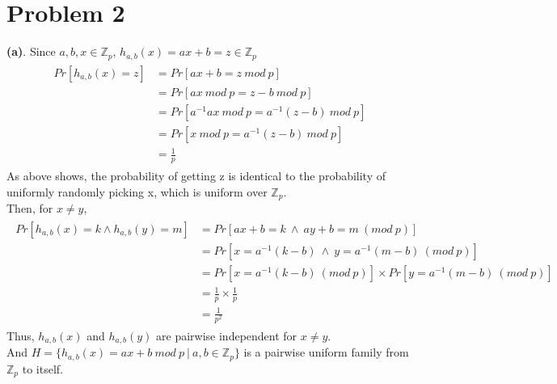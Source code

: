 \documentclass[titlepage, paper=a4, fontsize=11pt]{scrartcl} %
\numberwithin{equation}{section} %
\numberwithin{figure}{section} %
\numberwithin{table}{section} %
\begin{document}
\section*{Problem 2}
\textbf{(a)}. Since $a, b, x \in \mathbb{Z}_p$, $h_{a,b}(x) = ax+b = z \in \mathbb{Z}_p$
\begin{align*} 
\begin{split}
Pr[h_{a,b}(x) = z] &= Pr[ax+b = z \ mod \ p] \\
&= Pr[ax \ mod \ p = z-b \ mod \ p] \\
&= Pr[a^{-1}ax \ mod \ p = a^{-1}(z-b) \ mod \ p] \\
&= Pr[x \ mod \ p = a^{-1}(z-b) \ mod \ p] \\
&= \frac{1}{p}
\end{split}					
\end{align*}
As above shows, the probability of getting z is identical to the probability of uniformly randomly picking x, which is uniform over $\mathbb{Z}_p$. \\
Then, for $x \neq y$,
\begin{align*} 
\begin{split}
Pr[h_{a,b}(x) = k \land h_{a,b}(y) = m] &= Pr[ax+b=k \ \land \ ay+b=m \  (mod\ p)] \\
&= Pr[x=a^{-1}(k-b) \ \land \ y=a^{-1}(m-b) \  (mod\ p)] \\
&= Pr[x=a^{-1}(k-b) \  (mod\ p)] \times Pr[y=a^{-1}(m-b) \ (mod\ p)] \\
&= \frac{1}{p} \times \frac{1}{p} \\
&= \frac{1}{p^2}
\end{split}					
\end{align*}
Thus, $h_{a,b}(x)$ and $h_{a,b}(y)$ are pairwise independent for $x \neq y$. \\
And $H=\{ h_{a,b}(x)=ax+b \ mod\ p\ |\ a,b \in \mathbb{Z}_p \}$ is a pairwise uniform family from $\mathbb{Z}_p$ to itself. \\
\end{document}
